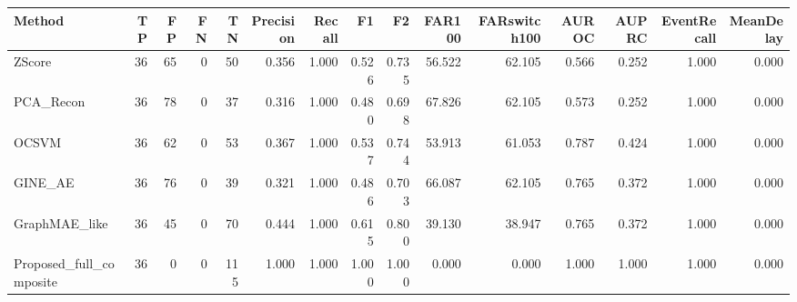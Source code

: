 \begin{tabular}{lrrrrrrrrrrrrrr}
\toprule
Method & TP & FP & FN & TN & Precision & Recall & F1 & F2 & FAR100 & FARswitch100 & AUROC & AUPRC & EventRecall & MeanDelay \\
\midrule
ZScore & 36 & 65 & 0 & 50 & 0.356 & 1.000 & 0.526 & 0.735 & 56.522 & 62.105 & 0.566 & 0.252 & 1.000 & 0.000 \\
PCA_Recon & 36 & 78 & 0 & 37 & 0.316 & 1.000 & 0.480 & 0.698 & 67.826 & 62.105 & 0.573 & 0.252 & 1.000 & 0.000 \\
OCSVM & 36 & 62 & 0 & 53 & 0.367 & 1.000 & 0.537 & 0.744 & 53.913 & 61.053 & 0.787 & 0.424 & 1.000 & 0.000 \\
GINE_AE & 36 & 76 & 0 & 39 & 0.321 & 1.000 & 0.486 & 0.703 & 66.087 & 62.105 & 0.765 & 0.372 & 1.000 & 0.000 \\
GraphMAE_like & 36 & 45 & 0 & 70 & 0.444 & 1.000 & 0.615 & 0.800 & 39.130 & 38.947 & 0.765 & 0.372 & 1.000 & 0.000 \\
Proposed_full_composite & 36 & 0 & 0 & 115 & 1.000 & 1.000 & 1.000 & 1.000 & 0.000 & 0.000 & 1.000 & 1.000 & 1.000 & 0.000 \\
\bottomrule
\end{tabular}

